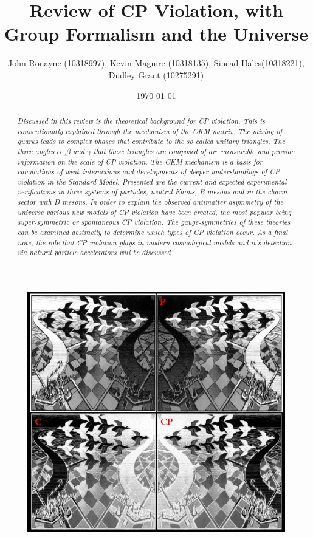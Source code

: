 \documentclass[floatfix,aps,prd,amsmath,amssymb]{revtex4}
\begin{document}
\title{Review of CP Violation, with Group Formalism and the Universe}
\author{John Ronayne (10318997), Kevin Maguire (10318135), Sinead Hales(10318221), Dudley Grant (10275291)}
\date{\today}

\begin{abstract}
\textit{Discussed in this review is the theoretical background for CP violation. This is conventionally explained through the mechanism of the CKM matrix. The mixing of quarks leads to complex phases that contribute to the so called unitary triangles. The three angles $\alpha$ ,$\beta$ and $\gamma$ that these triangles are composed of are measurable and provide information on the scale of CP violation. The CKM mechanism is a basis for calculations of weak interactions and developments of deeper understandings of CP violation in the Standard Model. Presented are the current and expected experimental verifications in three systems of particles, neutral Kaons, B mesons and in the charm sector with D mesons. In order to explain the observed antimatter asymmetry of the universe various new models of CP violation have been created, the most popular being super-symmetric or spontaneous CP violation. The gauge-symmetries of these theories can be examined abstractly to determine which types of CP violation occur. As a final note, the role that CP violation plays in modern cosmological models and it's detection via natural particle accelerators will be discussed}
\end{abstract}

\maketitle
{}

\begin{figure}[h!]
\begin{center}
\includegraphics[scale=0.8]{figs/Cover.jpg}
\end{center}
\end{figure}
\end{document}
